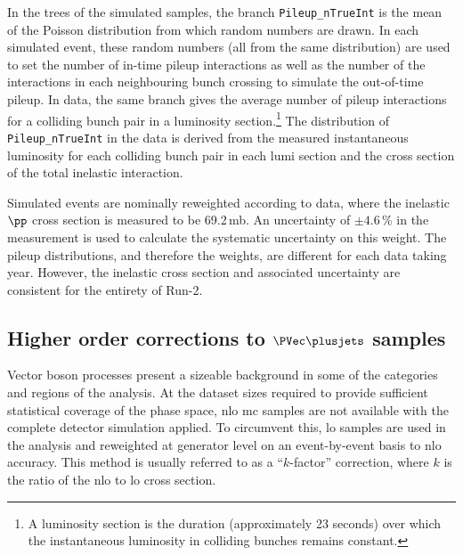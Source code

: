 In the trees of the simulated samples, the branch \texttt{Pileup\_nTrueInt} is the mean of the Poisson distribution from which random numbers are drawn. In each simulated event, these random numbers (all from the same distribution) are used to set the number of in-time \gls{pileup} interactions as well as the number of the interactions in each neighbouring bunch crossing to simulate the out-of-time \gls{pileup}. In data, the same branch gives the average number of \gls{pileup} interactions for a colliding bunch pair in a luminosity section.\footnote{A luminosity section is the duration (approximately 23 seconds) over which the instantaneous luminosity in colliding bunches remains constant.} The distribution of \texttt{Pileup\_nTrueInt} in the data is derived from the measured instantaneous luminosity for each colliding bunch pair in each lumi section and the cross section of the total inelastic \pp interaction.

Simulated events are nominally reweighted according to data, where the inelastic $\pp$ cross section is measured to be 69.2\,mb. An uncertainty of $\pm \text{4.6}$\,\% in the measurement is used to calculate the systematic uncertainty on this weight. The pileup distributions, and therefore the weights, are different for each data taking year. However, the inelastic cross section and associated uncertainty are consistent for the entirety of Run-2.





\subsection{Higher order corrections to \texorpdfstring{$\PVec \plusjets$}{V plus jets} samples}
\label{subsec:htoinv_nlo_corrs}

Vector boson \plusjets processes present a sizeable background in some of the categories and regions of the analysis. At the dataset sizes required to provide sufficient statistical coverage of the phase space, \acrshort{nlo} \acrshort{mc} samples are not available with the complete detector simulation applied. To circumvent this, \acrshort{lo} samples are used in the analysis and reweighted at generator level on an event-by-event basis to \acrshort{nlo} accuracy. This method is usually referred to as a ``$k$-factor'' correction, where $k$ is the ratio of the \acrshort{nlo} to \acrshort{lo} cross section.


